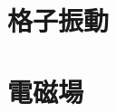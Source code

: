 \documentclass[a4paper]{jsreport}
\begin{document}
        \section{}
        \section{}
        \section{}

    \chapter{格子振動}


    \chapter{電磁場}
        
\end{document}

